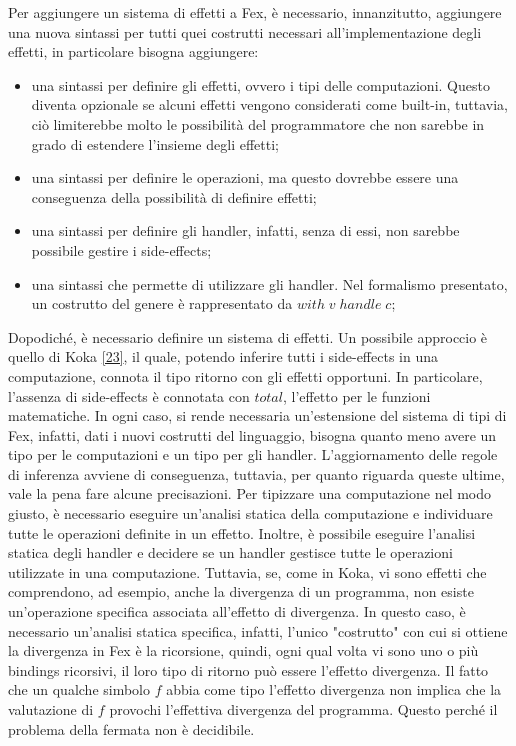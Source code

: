 \documentclass[10pt,a4paper]{article}
\begin{document}
Per aggiungere un sistema di effetti a Fex, è necessario, innanzitutto, aggiungere una nuova sintassi per tutti quei
costrutti necessari all'implementazione degli effetti, in particolare bisogna aggiungere:
\begin{itemize}
    \item una sintassi per definire gli effetti, ovvero i tipi delle computazioni. Questo diventa opzionale se alcuni
    effetti vengono considerati come built-in, tuttavia, ciò limiterebbe molto le possibilità del programmatore che non
    sarebbe in grado di estendere l'insieme degli effetti;
    \item una sintassi per definire le operazioni, ma questo dovrebbe essere una conseguenza della possibilità di
    definire effetti;
    \item una sintassi per definire gli handler, infatti, senza di essi, non sarebbe possibile gestire i side-effects;
    \item una sintassi che permette di utilizzare gli handler. Nel formalismo presentato, un costrutto del genere è
    rappresentato da $ with \; v \; handle \; c $;
\end{itemize}
Dopodiché, è necessario definire un sistema di effetti. Un possibile approccio è quello di Koka \hyperlink{bibl23}{[23]},
il quale, potendo
inferire tutti i side-effects in una computazione, connota il tipo ritorno con gli effetti opportuni. In particolare,
l'assenza di side-effects è connotata con $ total $, l'effetto per le funzioni matematiche. In ogni caso, si rende
necessaria un'estensione del sistema di tipi di Fex, infatti, dati i nuovi costrutti del linguaggio, bisogna quanto
meno avere un tipo per le computazioni e un tipo per gli handler. L'aggiornamento delle regole di inferenza avviene di
conseguenza, tuttavia, per quanto riguarda queste ultime, vale la pena fare alcune precisazioni. Per tipizzare
una computazione nel modo giusto, è necessario eseguire un'analisi statica della computazione e individuare tutte le
operazioni definite in un effetto. Inoltre, è possibile eseguire l'analisi statica degli handler e decidere se un handler
gestisce tutte le operazioni utilizzate in una computazione. Tuttavia, se, come in Koka, vi sono effetti che comprendono,
ad esempio, anche la divergenza di un programma, non esiste un'operazione specifica associata all'effetto di divergenza.
In questo caso, è necessario un'analisi statica specifica, infatti, l'unico "costrutto" con cui si ottiene la divergenza
in Fex è la ricorsione,
quindi, ogni qual volta vi sono uno o più bindings ricorsivi, il loro tipo di ritorno può essere l'effetto divergenza.
Il fatto che un qualche simbolo $ f $ abbia come tipo l'effetto divergenza non implica che la valutazione di $ f $
provochi l'effettiva divergenza del programma. Questo perché il problema della fermata non è decidibile.
\end{document}
